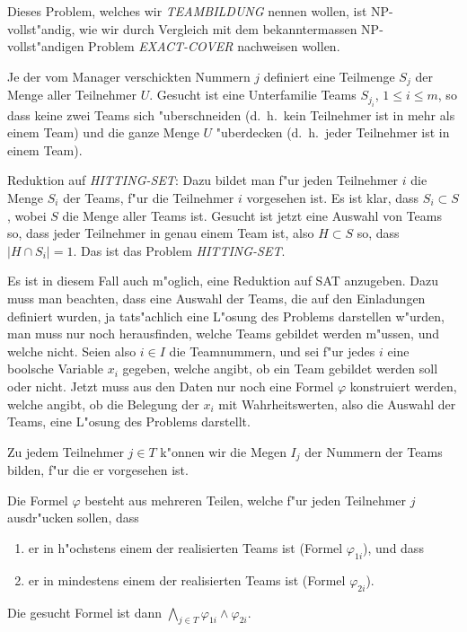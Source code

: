\begin{loesung}
Dieses Problem, welches wir \textsl{TEAMBILDUNG} nennen wollen,
ist NP-vollst"andig, wie wir durch Vergleich mit dem bekanntermassen
NP-vollst"andigen Problem \textsl{EXACT-COVER} nachweisen wollen.

Je der vom Manager verschickten Nummern $j$ definiert eine Teilmenge
$S_j$ der Menge aller Teilnehmer $U$. Gesucht ist eine Unterfamilie
Teams $S_{j_i}$, $1\le i\le m$, so dass keine zwei Teams sich "uberschneiden
(d.~h.~kein Teilnehmer ist in mehr als einem Team) und die ganze Menge $U$
"uberdecken (d.~h.~jeder Teilnehmer ist in einem Team).

\medskip
Reduktion auf \textsl{HITTING-SET}: Dazu bildet man f"ur jeden
Teilnehmer $i$ die Menge $S_i$ der Teams, f"ur die Teilnehmer $i$
vorgesehen ist. Es ist klar, dass $S_i\subset S$, wobei $S$ die Menge
aller Teams ist. Gesucht ist jetzt eine Auswahl von Teams so, dass
jeder Teilnehmer in genau einem Team ist, also $H\subset S$ so,
dass $|H\cap S_i|=1$. Das ist das Problem \textsl{HITTING-SET}.

\medskip
Es ist in diesem Fall auch m"oglich, eine Reduktion auf SAT anzugeben.
Dazu muss man beachten, dass eine Auswahl der Teams, die auf den
Einladungen definiert wurden, ja tats"achlich eine L"osung des
Problems darstellen w"urden, man muss nur noch herausfinden, welche
Teams gebildet werden m"ussen, und welche nicht. Seien also $i\in I$
die Teamnummern, und sei f"ur jedes $i$ eine boolsche Variable $x_i$
gegeben, welche angibt, ob ein Team gebildet werden soll oder nicht.
Jetzt muss aus den Daten nur noch eine Formel $\varphi$ konstruiert werden,
welche angibt, ob die Belegung der $x_i$ mit Wahrheitswerten, also die Auswahl
der Teams, eine L"osung des Problems darstellt.

Zu jedem Teilnehmer $j\in T$ k"onnen wir die Megen $I_j$ der Nummern
der Teams bilden, f"ur die er vorgesehen ist.

Die Formel $\varphi$ besteht aus mehreren Teilen, welche f"ur jeden
Teilnehmer $j$ ausdr"ucken sollen, dass 
\begin{enumerate}
\item er in h"ochstens einem der realisierten Teams ist (Formel $\varphi_{1i}$),
und dass
\item er in mindestens einem der realisierten Teams ist (Formel $\varphi_{2i}$).
\end{enumerate}
Die gesucht Formel ist dann
$\bigwedge_{j\in T} \varphi_{1i}\wedge \varphi_{2i}$.


\end{loesung}
